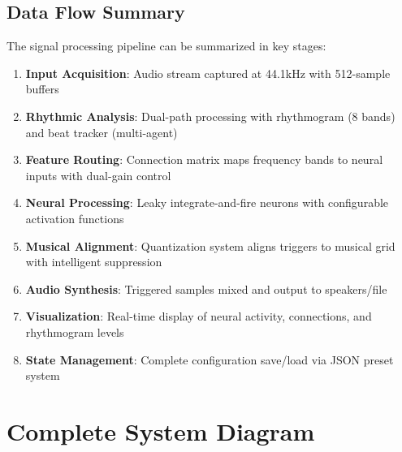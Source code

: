 \documentclass[11pt,a4paper]{article}
\begin{document}
\subsection{Data Flow Summary}

The signal processing pipeline can be summarized in key stages:

\begin{enumerate}
\item \textbf{Input Acquisition}: Audio stream captured at 44.1kHz with 512-sample buffers
\item \textbf{Rhythmic Analysis}: Dual-path processing with rhythmogram (8 bands) and beat tracker (multi-agent)
\item \textbf{Feature Routing}: Connection matrix maps frequency bands to neural inputs with dual-gain control
\item \textbf{Neural Processing}: Leaky integrate-and-fire neurons with configurable activation functions
\item \textbf{Musical Alignment}: Quantization system aligns triggers to musical grid with intelligent suppression
\item \textbf{Audio Synthesis}: Triggered samples mixed and output to speakers/file
\item \textbf{Visualization}: Real-time display of neural activity, connections, and rhythmogram levels
\item \textbf{State Management}: Complete configuration save/load via JSON preset system
\end{enumerate}

\section{Complete System Diagram}
\end{document}
